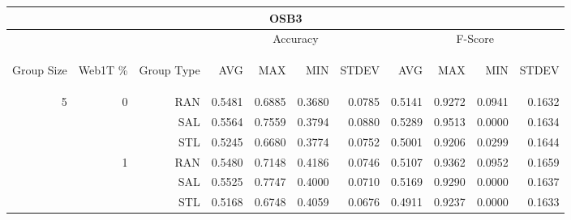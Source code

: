 \begin{center}
\begin{table}[htbp]
\begin{tabular}{ | r | r | r | r | r | r | r | r | r | r | r |}
\hline
\multicolumn{11}{|c|}{OSB3}\\
\hline
 & & & \multicolumn{4}{|c|}{Accuracy} & \multicolumn{4}{|c|}{F-Score}\\ \cline{4-11}
\begin{sideways}Group Size\end{sideways} & \begin{sideways}Web1T \%\end{sideways} & \begin{sideways}Group Type\end{sideways} & \begin{sideways}AVG\end{sideways} & \begin{sideways}MAX\end{sideways} & \begin{sideways}MIN\end{sideways} & \begin{sideways}STDEV\end{sideways} & \begin{sideways}AVG\end{sideways} & \begin{sideways}MAX\end{sideways} & \begin{sideways}MIN\end{sideways} & \begin{sideways}STDEV\end{sideways}\\
\hline
\multirow{18}{*}{5}
 & \multirow{3}{*}{0} & RAN & 0.5481 & 0.6885 & 0.3680 & 0.0785 & 0.5141 & 0.9272 & 0.0941 & 0.1632\\ \cline{3-11}
 &   & SAL & 0.5564 & 0.7559 & 0.3794 & 0.0880 & 0.5289 & 0.9513 & 0.0000 & 0.1634\\ \cline{3-11}
 &   & STL & 0.5245 & 0.6680 & 0.3774 & 0.0752 & 0.5001 & 0.9206 & 0.0299 & 0.1644\\ \cline{2-11}
 & \multirow{3}{*}{1} & RAN & 0.5480 & 0.7148 & 0.4186 & 0.0746 & 0.5107 & 0.9362 & 0.0952 & 0.1659\\ \cline{3-11}
 &   & SAL & 0.5525 & 0.7747 & 0.4000 & 0.0710 & 0.5169 & 0.9290 & 0.0000 & 0.1637\\ \cline{3-11}
 &   & STL & 0.5168 & 0.6748 & 0.4059 & 0.0676 & 0.4911 & 0.9237 & 0.0000 & 0.1633\\ \cline{2-11}

\end{tabular}
\end{table}
\end{center}
